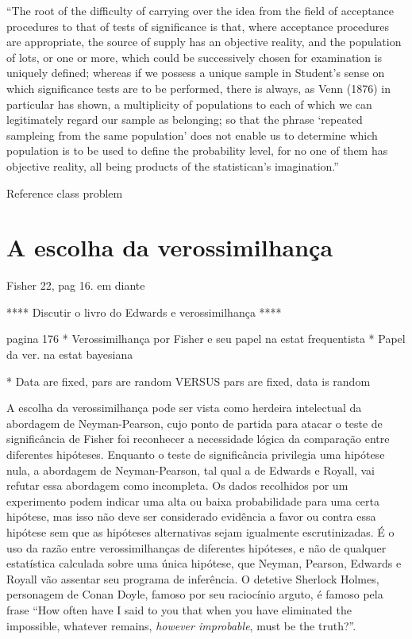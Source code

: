 ``The root of the difficulty of carrying over the idea from the field of acceptance procedures to that of tests of significance
is that, where acceptance procedures are appropriate, the source of supply has an objective reality, and the population
of lots, or one or more, which could be successively chosen for examination is uniquely defined; whereas if we possess a unique
sample in Student's sense on which significance tests are to be performed, there is always, as Venn (1876) in particular has
shown, a multiplicity of populations to each of which we can legitimately regard our sample as belonging; so that the phrase
`repeated sampleing from the same population' does not enable us to determine which population is to be used to define the
probability level, for no one of them has objective reality, all being products of the statistican's imagination.''
\citep{Fisher1955}

Reference class problem

\section{A escolha da verossimilhança}\label{sec:likelihood}
Fisher 22, pag 16. em diante

**** Discutir o livro do Edwards e verossimilhança ****

 pagina 176
* Verossimilhança por Fisher e seu papel na estat frequentista
* Papel da ver. na estat bayesiana

* Data are fixed, pars are random VERSUS pars are fixed, data is random

A escolha da verossimilhança pode ser vista como herdeira intelectual da abordagem de Neyman-Pearson, cujo ponto de partida
para atacar o teste de significância de Fisher foi reconhecer a necessidade lógica da comparação entre diferentes hipóteses.
Enquanto o teste de significância privilegia uma hipótese nula, a abordagem de Neyman-Pearson, tal qual a de Edwards e Royall,
vai refutar essa abordagem como incompleta. Os dados recolhidos por um experimento podem indicar uma alta ou baixa
probabilidade para uma certa hipótese, mas isso não deve ser considerado evidência a favor ou contra essa hipótese sem
que as hipóteses alternativas sejam igualmente escrutinizadas. É o uso da razão entre verossimilhanças de diferentes hipóteses,
e não de qualquer estatística calculada sobre uma única hipótese, que Neyman, Pearson, Edwards e Royall vão assentar seu
programa de inferência. O detetive Sherlock Holmes, personagem de Conan Doyle, famoso por seu raciocínio arguto, é famoso
pela frase ``How often have I said to you that when you have eliminated the impossible, whatever remains, {\em however 
improbable}, must be the truth?''.

